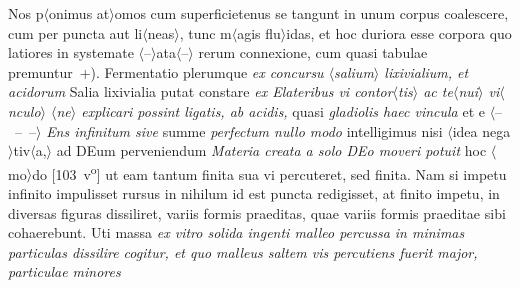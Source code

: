 Nos p$\langle$onimus at$\rangle$omos cum superficietenus se tangunt in unum corpus coalescere,
cum per puncta aut li$\langle$neas$\rangle$,
tunc m$\langle$agis flu$\rangle$idas, et hoc duriora esse corpora quo latiores
in systemate $\langle$--$\rangle$ata$\langle$--$\rangle$
rerum connexione\protect{}, cum quasi tabulae premuntur~+).
Fermentatio\protect{} plerumque
\textit{ex concursu $\langle$salium$\rangle$ lixivialium, et acidorum
}
Salia lixivialia\protect{} putat constare
\textit{ex Elateribus\protect{} vi contor$\langle$tis$\rangle$
ac te$\langle$nui$\rangle$ vi$\langle$nculo$\rangle$ $\langle$ne$\rangle$ explicari possint
ligatis, ab acidis,\protect{}}
quasi \textit{gladiolis\protect{} haec vincula
}
et e $\langle$--~--~--$\rangle$
\textit{Ens infinitum sive} summe \textit{perfectum nullo modo} intelligimus
nisi $\langle$idea nega$\rangle$tiv$\langle$a,$\rangle$ ad DEum perveniendum  \textit{Materia creata a solo DEo moveri potuit} hoc $\langle$mo$\rangle$do
%
[103~v\textsuperscript{o}]
%
ut eam tantum finita sua vi percuteret, sed finita. Nam si impetu infinito impulisset rursus in nihilum id est puncta redigisset, at finito impetu, in diversas figuras dissiliret, variis formis praeditas, quae variis formis praeditae sibi cohaerebunt. Uti massa \textit{ex vitro solida ingenti malleo\protect{} percussa in minimas particulas dissilire cogitur, et quo malleus saltem vis percutiens fuerit major,}
\textit{particulae\protect{} minores
}
